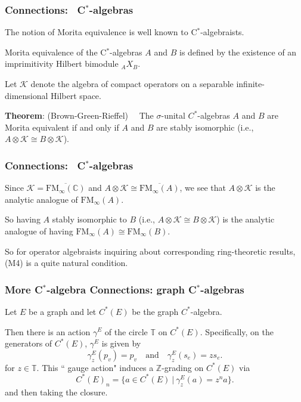 \documentclass{beamer}
\begin{document}
\begin{frame}
\frametitle{Connections: \ C$^*$-algebras}


\pause

The notion of Morita equivalence is well known to C$^*$-algebraists.  

\medskip



Morita equivalence of the C$^*$-algebras $A$ and $B$ is defined by the existence of an imprimitivity Hilbert bimodule ${}_AX_B$.  

\medskip

Let $\mathcal{K}$ denote the algebra of compact operators on a separable infinite-dimensional Hilbert space. 

\bigskip


{\bf Theorem}:  (Brown-Green-Rieffel) \ \   The $\sigma$-unital $C^*$-algebras $A$ and $B$ are Morita equivalent if and only if $A$ and $B$ are stably isomorphic (i.e., $A \otimes \mathcal{K} \cong B \otimes \mathcal{K}$).    

\end{frame}


\begin{frame}
\frametitle{Connections: \ C$^*$-algebras}


 Since $\mathcal{K} = \overline{\mathrm{FM}_\infty(\mathbb{C})}$ and $A \otimes \mathcal{K} \cong \overline{\mathrm{FM}_\infty(A)}$, we see that $A \otimes \mathcal{K}$ is the analytic analogue of $\mathrm{FM}_\infty(A)$.
 
 \bigskip   
 
 So  having $A$ stably isomorphic to $B$ (i.e., $A \otimes \mathcal{K} \cong B \otimes \mathcal{K}$) is the analytic analogue of having $\mathrm{FM}_\infty (A) \cong \mathrm{FM}_\infty (B)$.  
 
 
 \bigskip
 
 
 So for  operator algebraists inquiring about corresponding ring-theoretic results, (M4) is a quite natural condition.
 
 
 \end{frame}
 

\begin{frame}
\frametitle{More C$^*$-algebra Connections: graph C$^*$-algebras}

Let $E$ be a graph and let $C^*(E)$ be the graph $C^*$-algebra.  

\medskip

Then  there is an action $\gamma^E$ of the circle $\mathbb{T}$ on $C^*(E)$.  
Specifically, on the generators of $C^*(E)$, $\gamma^E$  is given by  
$$
\gamma_z^E(p_v)=p_v \quad \text{and} \quad \gamma_z^E(s_e)=z s_e.
$$
for $z\in \mathbb{T}$.  
This `` gauge action" induces a $\mathbb{Z}$-grading on $C^*(E)$  via
$$
C^*(E)_n = \{ a \in C^*(E) \ | \  \gamma_z^E(a)=z^n a \}.
$$
and then taking the closure.  

 \end{frame}
 
\end{document}
